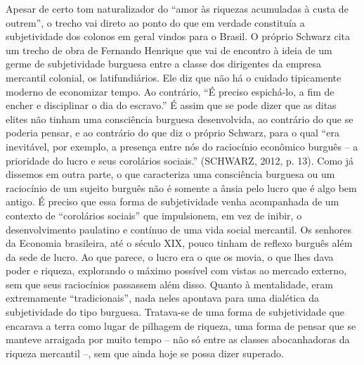 Apesar de certo tom naturalizador do ``amor às riquezas acumuladas à
custa de outrem'', o trecho vai direto ao ponto do que em verdade
constituía a subjetividade dos colonos em geral vindos para o Brasil. O
próprio Schwarz cita um trecho de obra de Fernando Henrique que vai de
encontro à ideia de um germe de subjetividade burguesa entre a classe
dos dirigentes da empresa mercantil colonial, os latifundiários. Ele diz
que não há o cuidado tipicamente moderno de economizar tempo. Ao
contrário, ``É preciso espichá-lo, a fim de encher e disciplinar o dia
do escravo.'' É assim que se pode dizer que as ditas elites não tinham
uma consciência burguesa desenvolvida, ao contrário do que se poderia
pensar, e ao contrário do que diz o próprio Schwarz, para o qual ``era
inevitável, por exemplo, a presença entre nós do raciocínio econômico
burguês -- a prioridade do lucro e seus corolários sociais.'' (SCHWARZ,
2012, p. 13). Como já dissemos em outra parte, o que caracteriza uma
consciência burguesa ou um raciocínio de um sujeito burguês não é
somente a ânsia pelo lucro que é algo bem antigo. É preciso que essa
forma de subjetividade venha acompanhada de um contexto de ``corolários
sociais'' que impulsionem, em vez de inibir, o desenvolvimento paulatino
e contínuo de uma vida social mercantil. Os senhores da Economia
brasileira, até o século XIX, pouco tinham de reflexo burguês além da
sede de lucro. Ao que parece, o lucro era o que os movia, o que lhes
dava poder e riqueza, explorando o máximo possível com vistas ao mercado
externo, sem que seus raciocínios passassem além disso. Quanto à
mentalidade, eram extremamente ``tradicionais'', nada neles apontava
para uma dialética da subjetividade do tipo burguesa. Tratava-se de uma
forma de subjetividade que encarava a terra como lugar de pilhagem de
riqueza, uma forma de pensar que se manteve arraigada por muito tempo --
não só entre as classes abocanhadoras da riqueza mercantil --, sem que
ainda hoje se possa dizer superado.

